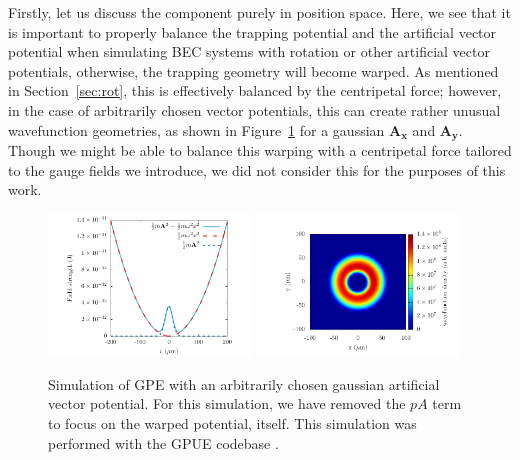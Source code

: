 Firstly, let us discuss the component purely in position space.
Here, we see that it is important to properly balance the trapping potential and the artificial vector potential when simulating BEC systems with rotation or other artificial vector potentials, otherwise, the trapping geometry will become warped.
As mentioned in Section~\ref{sec:rot}, this is effectively balanced by the centripetal force; however, 
in the case of arbitrarily chosen vector potentials, this can create rather unusual wavefunction geometries, as shown in Figure~\ref{fig:V_change} for a gaussian $\mathbf{A_x}$ and $\mathbf{A_y}$.
Though we might be able to balance this warping with a centripetal force tailored to the gauge fields we introduce, we did not consider this for the purposes of this work.

\begin{figure}

\begin{centering}
\includegraphics[width=0.48\textwidth]{data/splitop/gauge/check.pdf}
\includegraphics[width=0.48\textwidth]{data/splitop/gauge/density.pdf}
\end{centering}

\caption{
Simulation of GPE with an arbitrarily chosen gaussian artificial vector potential.
For this simulation, we have removed the $pA$ term to focus on the warped potential, itself.
This simulation was performed with the GPUE codebase \cite{schloss2018}.
}
\label{fig:V_change}
\end{figure}

